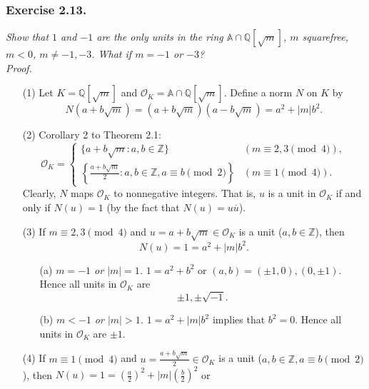 \documentclass{article}
\begin{document}



\subsubsection*{Exercise 2.13.}
\emph{Show that $1$ and $-1$ are the only units in the ring
$\mathbb{A} \cap \mathbb{Q}[\sqrt{m}]$, $m$ squarefree, $m < 0$,
$m \neq -1, -3$.
What if $m = -1$ or $-3$?} \\

\emph{Proof.}
\begin{enumerate}
\item[(1)]
Let $K = \mathbb{Q}[\sqrt{m}]$ and $\mathcal{O}_K = \mathbb{A} \cap \mathbb{Q}[\sqrt{m}]$.
Define a norm $N$ on $K$
by $$N(a+b\sqrt{m}) = (a+b\sqrt{m})(a-b\sqrt{m}) = a^2 + |m|b^2.$$
\item[(2)]
Corollary 2 to Theorem 2.1:
\begin{equation*}
  \mathcal{O}_K =
    \begin{cases}
      \{ a+b\sqrt{m} : a,b \in \mathbb{Z} \}
        & (m \equiv 2,3 \pmod{4}), \\
      \left\{ \frac{a+b\sqrt{m}}{2} : a,b \in \mathbb{Z}, a \equiv b \pmod{2} \right\}
        & (m \equiv 1 \pmod{4}).
    \end{cases}
\end{equation*}
Clearly, $N$ maps $\mathcal{O}_K$ to nonnegative integers.
That is, $u$ is a unit in $\mathcal{O}_K$ if and only if $N(u) = 1$
(by the fact that $N(u) = u \overline{u}$).
\item[(3)]
If $m \equiv 2,3 \pmod{4}$ and $u = a + b\sqrt{m} \in \mathcal{O}_K$ is a unit
($a, b \in \mathbb{Z}$),
then $$N(u) = 1 = a^2 + |m|b^2.$$
  \begin{enumerate}
  \item[(a)]
  \emph{$m = -1$ or $|m| = 1$.}
  $1 = a^2 + b^2$ or $(a,b) = (\pm 1,0), (0, \pm 1)$.
  Hence all units in $\mathcal{O}_K$ are
  $$\pm 1, \pm \sqrt{-1}.$$
  \item[(b)]
  \emph{$m < -1$ or $|m| > 1$.}
  $1 = a^2 + |m|b^2$ implies that $b^2 = 0$.
  Hence all units in $\mathcal{O}_K$ are $\pm 1$.
  \end{enumerate}
\item[(4)]
If $m \equiv 1 \pmod{4}$ and $u = \frac{a + b\sqrt{m}}{2} \in \mathcal{O}_K$ is a unit
($a, b \in \mathbb{Z}, a \equiv b \pmod{2}$),
then $N(u) = 1 = (\frac{a}{2})^2 + |m|(\frac{b}{2})^2$ or

\end{enumerate}
\end{document}
